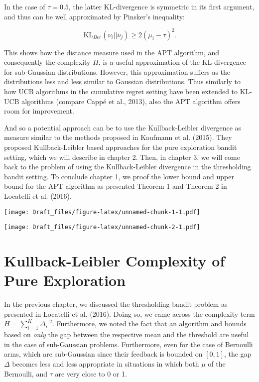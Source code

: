 \documentclass[12pt,]{article}
\newcommand{\KL}{\,\text{KL}}
\begin{document}
In the case of \(\tau = 0.5\), the latter KL-divergence is symmetric in
its first argument, and thus can be well approximated by Pinsker's
inequality:

\[
\KL_{Ber}(\nu_i||\nu_j) \geq 2(\mu_i - \tau)^2.
\]

This shows how the distance measure used in the APT algorithm, and
consequently the complexity \(H\), is a useful approximation of the
KL-divergence for sub-Gaussian distributions. However, this
approximation suffers as the distributions less and less similar to
Gaussian distributions. Thus similarly to how UCB algorithms in the
cumulative regret setting have been extended to KL-UCB algorithms
(compare Cappé et al., 2013), also the APT algorithm offers room for
improvement.

And so a potential approach can be to use the Kullback-Leibler
divergence as measure similar to the methods proposed in Kaufmann et al.
(2015). They proposed Kullback-Leibler based approaches for the pure
exploration bandit setting, which we will describe in chapter 2. Then,
in chapter 3, we will come back to the problem of using the
Kullback-Leibler divergence in the thresholding bandit setting. To
conclude chapter 1, we proof the lower bound and upper bound for the APT
algorithm as presented Theorem 1 and Theorem 2 in Locatelli et al.
(2016).

\texttt{[image: Draft\_files/figure-latex/unnamed-chunk-1-1.pdf]}

\texttt{[image: Draft\_files/figure-latex/unnamed-chunk-2-1.pdf]}

\newpage

\section{Kullback-Leibler Complexity of Pure
Exploration}\label{kullback-leibler-complexity-of-pure-exploration}

In the previous chapter, we discussed the thresholding bandit problem as
presented in Locatelli et al. (2016). Doing so, we came across the
complexity term \(H = \sum_{i=1}^{K} \Delta_i^{-2}\). Furthermore, we
noted the fact that an algorithm and bounds based on \emph{only} the gap
between the respective mean and the threshold are useful in the case of
sub-Gaussian problems. Furthermore, even for the case of Bernoulli arms,
which are sub-Gaussian since their feedback is bounded on \([0,1]\), the
gap \(\Delta\) becomes less and less appropriate in situations in which
both \(\mu\) of the Bernoulli, and \(\tau\) are very close to 0 or 1.
\end{document}
